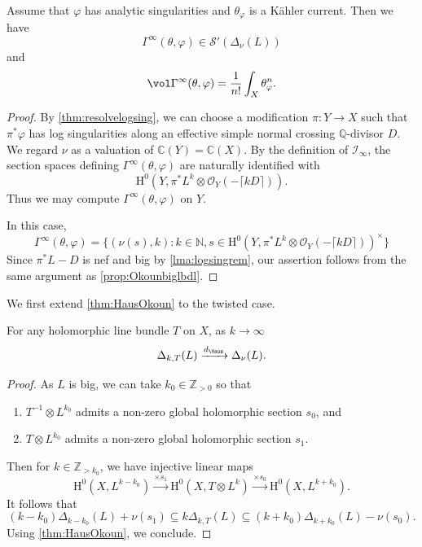 \begin{proposition}\label{prop:GammaepsSp}
Assume that $\varphi$ has analytic singularities and $\theta_{\varphi}$ is a Kähler current. Then we have
    \[
    \Gamma^{\infty}(\theta,\varphi)\in \mathcal{S}'(\Delta_\nu(L))
    \]
    and
    \[
    \vol \Gamma^{\infty}(\theta,\varphi)=\frac{1}{n!}\int_X \theta_{\varphi}^n.
    \]
\end{proposition}
\begin{proof}
    By \cref{thm:resolvelogsing}, we can choose a modification $\pi\colon Y\to X$ such that $\pi^*\varphi$ has log singularities along an effective simple normal crossing $\mathbb Q$-divisor $D$. We regard $\nu$ as a valuation of $\mathbb C(Y)=\mathbb C(X)$. By the definition of $\mathcal I_\infty$, the section spaces defining $\Gamma^\infty(\theta,\varphi)$ are naturally identified with
    \[
        \mathrm{H}^0\left(Y,\pi^*L^k\otimes\mathcal O_Y(-\lceil kD\rceil)\right).
    \]
    Thus we may compute $\Gamma^\infty(\theta,\varphi)$ on $Y$.


    In this case,
    \[
    \Gamma^{\infty}(\theta,\varphi)=
    \Biggl\{
    (\nu(s),k):k\in \mathbb{N},  s\in \mathrm{H}^0\left(Y,\pi^*L^k\otimes \mathcal{O}_Y(-\lceil k D \rceil)\right)^{\times}
    \Biggr\}
    \]
    Since $\pi^*L-D$ is nef and big by \cref{lma:logsingrem}, our assertion follows from the same argument as \cref{prop:Okounbiglbdl}.
\end{proof}

We first extend \cref{thm:HausOkoun} to the twisted case.
\begin{proposition}\label{prop:Deltaconvtwisted}
    For any holomorphic line bundle $T$ on $X$, as $k\to\infty$
    \[
        \Delta_{k,T}(L)\xrightarrow{d_{\Haus}} \Delta_{\nu}(L).
    \]
\end{proposition}

\begin{proof}
    As $L$ is big, we can take $k_0\in \mathbb{Z}_{>0}$ so that
    \begin{enumerate}
        \item\label{itm:chapter-Okounkov:L657:1} $T^{-1}\otimes L^{k_0}$ admits a non-zero global holomorphic section $s_0$, and
        \item\label{itm:chapter-Okounkov:L657:2} $T\otimes L^{k_0}$ admits a non-zero global holomorphic section $s_1$.
    \end{enumerate}
    Then for $k\in \mathbb{Z}_{>k_0}$, we have injective linear maps
    \[
        \mathrm{H}^0(X,L^{k-k_0})\xrightarrow{\times s_1}\mathrm{H}^0(X,T\otimes L^{k})\xrightarrow{\times s_0}\mathrm{H}^0(X, L^{k+k_0}).
    \]
    It follows that
    \[
        (k-k_0)\Delta_{k-k_0}(L)+\nu(s_1)\subseteq k\Delta_{k,T}(L)\subseteq (k+k_0)\Delta_{k+k_0}(L)-\nu(s_0).
    \]
    Using \cref{thm:HausOkoun}, we conclude.
\end{proof}

